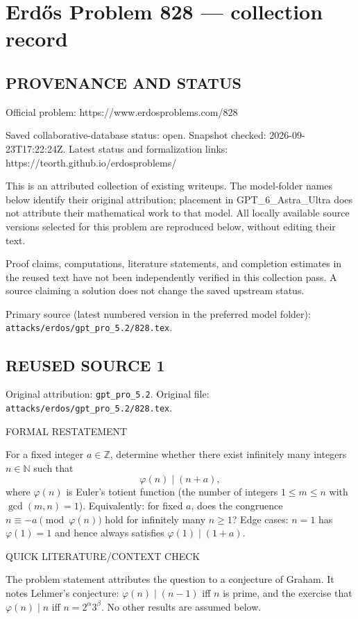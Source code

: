 \section*{Erd\H{o}s Problem 828 --- collection record}

\subsection*{PROVENANCE AND STATUS}
Official problem: https://www.erdosproblems.com/828

Saved collaborative-database status: open.
Snapshot checked: 2026-09-23T17:22:24Z.
Latest status and formalization links: https://teorth.github.io/erdosproblems/

This is an attributed collection of existing writeups. The model-folder names below identify their original attribution; placement in GPT\_6\_Astra\_Ultra does not attribute their mathematical work to that model. All locally available source versions selected for this problem are reproduced below, without editing their text.

Proof claims, computations, literature statements, and completion estimates in the reused text have not been independently verified in this collection pass. A source claiming a solution does not change the saved upstream status.

Primary source (latest numbered version in the preferred model folder): \texttt{attacks/erdos/gpt\_pro\_5.2/828.tex}.

\subsection*{REUSED SOURCE 1}
Original attribution: \texttt{gpt\_pro\_5.2}.
Original file: \texttt{attacks/erdos/gpt\_pro\_5.2/828.tex}.



FORMAL RESTATEMENT

For a fixed integer $a\in\mathbb{Z}$, determine whether there exist infinitely many integers $n\in\mathbb{N}$ such that
\[
\varphi(n)\mid (n+a),
\]
where $\varphi(n)$ is Euler's totient function (the number of integers $1\leq m\leq n$ with $\gcd(m,n)=1$).
Equivalently: for fixed $a$, does the congruence $n\equiv -a\pmod{\varphi(n)}$ hold for infinitely many $n\ge1$?
Edge cases: $n=1$ has $\varphi(1)=1$ and hence always satisfies $\varphi(1)\mid (1+a)$.

QUICK LITERATURE/CONTEXT CHECK

The problem statement attributes the question to a conjecture of Graham.
It notes Lehmer's conjecture: $\varphi(n)\mid (n-1)$ iff $n$ is prime, and the exercise that $\varphi(n)\mid n$ iff $n=2^\alpha 3^\beta$.
No other results are assumed below.

